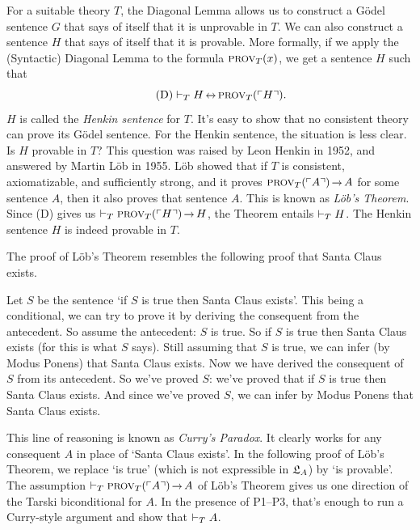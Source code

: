 For a suitable theory $T$,
the Diagonal Lemma allows us to construct a Gödel sentence $G$
that says of itself that it is unprovable in $T$.
We can also construct a sentence $H$ that
says of itself that it is provable.
More formally,
if we apply the (Syntactic) Diagonal Lemma to the formula $\smallcaps{Prov}_T(x)$,
we get a sentence $H$ such that
\begin{equation}\tag{D}
  \proves_T H \leftrightarrow \smallcaps{Prov}_T(\gn{H}).
\end{equation}
$H$ is called the \emph{Henkin sentence} for $T$.
It's easy to show that
no consistent theory can prove its Gödel sentence.
For the Henkin sentence,
the situation is less clear.
Is $H$ provable in $T$?
This question was raised by Leon Henkin in 1952,
and answered by Martin Löb in 1955.
Löb showed that if $T$ is consistent, axiomatizable, and sufficiently strong,
and it proves $\smallcaps{Prov}_T(\gn{A}) \to A$
for some sentence $A$,
then it also proves that sentence $A$.
This is known as \emph{Löb's Theorem}.
Since (D) gives us $\proves_T \smallcaps{Prov}_T(\gn{H}) \to H$,
the Theorem entails $\vdash_T H$.
The Henkin sentence $H$ is indeed provable in $T$.

The proof of Löb's Theorem resembles the following proof that Santa Claus exists.

Let $S$ be the sentence `if $S$ is true then Santa Claus exists'.
This being a conditional,
we can try to prove it by deriving the consequent from the antecedent.
So assume the antecedent: $S$ is true.
So if $S$ is true then Santa Claus exists
(for this is what $S$ says).
Still assuming that $S$ is true,
we can infer (by Modus Ponens) that Santa Claus exists.
Now we have derived the consequent of $S$ from its antecedent.
So we've proved $S$:
we've proved that if $S$ is true then Santa Claus exists.
And since we've proved $S$,
we can infer by Modus Ponens that Santa Claus exists.

This line of reasoning is known as \emph{Curry's Paradox}.
It clearly works for any consequent $A$ in place of `Santa Claus exists'.
In the following proof of Löb's Theorem,
we replace `is true' (which is not expressible in $\mathfrak{L}_A$) by `is provable'.
The assumption $\proves_T \smallcaps{Prov}_T(\gn{A}) \to A$ of Löb's Theorem
gives us one direction of the Tarski biconditional for $A$.
In the presence of P1--P3,
that's enough to run a Curry-style argument and show that $\vdash_T A$.

